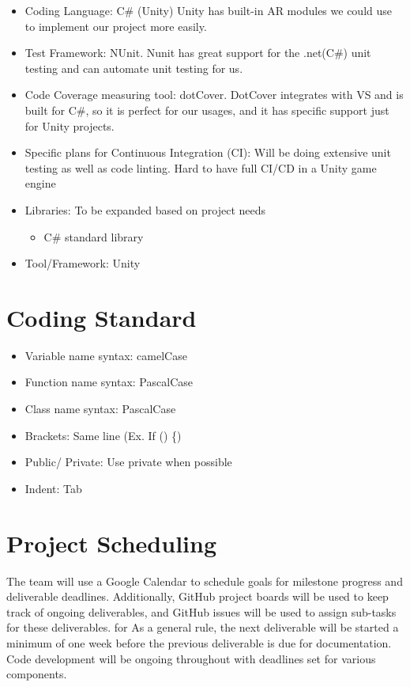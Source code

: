 \documentclass{article}
\begin{document}
\begin{itemize}
\item Coding Language: C\# (Unity) Unity has built-in AR modules we could use to implement our project more easily. 
\item Test Framework: NUnit. Nunit has great support for the .net(C\#) unit testing and can automate unit testing for us. 
\item Code Coverage measuring tool: dotCover. DotCover integrates with VS and is built for C\#, so it is perfect for our usages, and it has specific support just for Unity projects. 
\item Specific plans for Continuous Integration (CI): Will be doing extensive unit testing as well as code linting. Hard to have full CI/CD in a Unity game engine
\item Libraries: To be expanded based on project needs
    \begin{itemize}
    \item C\# standard library
    \end{itemize}
\item Tool/Framework: Unity
\end{itemize}

\section{Coding Standard}
\begin{itemize}
    \item Variable name syntax: camelCase
    \item Function name syntax: PascalCase
    \item Class name syntax: PascalCase
    \item Brackets: Same line (Ex. If () \{)
    \item Public/ Private: Use private when possible
    \item Indent: Tab 
\end{itemize}

\section{Project Scheduling}

The team will use a Google Calendar to schedule goals for milestone progress and deliverable deadlines. Additionally, GitHub project boards will be used to keep track of ongoing deliverables, and GitHub issues will be used to assign sub-tasks for these deliverables. for As a general rule, the next deliverable will be started a minimum of one week before the previous deliverable is due for documentation. Code development will be ongoing throughout with deadlines set for various components. 
\end{document}
